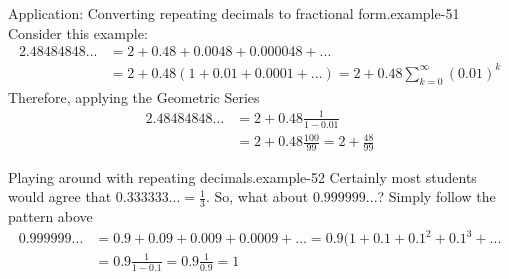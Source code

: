 \documentclass[10pt,]{book}
\numberwithin{equation}{section}
\begin{document}
\begin{example}{Application: Converting repeating decimals to fractional form.}{example-51}%
\hypertarget{p-1216}{}%
Consider this example:%
%
\begin{align*}
2.48484848... & = 2 + 0.48 + 0.0048 + 0.000048 + ...\\
&  = 2 + 0.48(1 + 0.01 + 0.0001 + ... ) = 2 + 0.48 \sum_{k=0}^\infty (0.01)^k
\end{align*}
\hypertarget{p-1217}{}%
Therefore, applying the Geometric Series%
%
\begin{align*}
2.48484848... & = 2 + 0.48 \frac{1}{1-0.01} \\
& = 2 + 0.48 \frac{100}{99} = 2 + \frac{48}{99} 
\end{align*}
\end{example}
\begin{example}{Playing around with repeating decimals.}{example-52}%
\hypertarget{p-1218}{}%
Certainly most students would agree that \(0.333333... = \frac{1}{3} \). So, what about \(0.999999...\)? Simply follow the pattern above%
%
\begin{align*}
0.999999... & = 0.9 + 0.09 + 0.009 + 0.0009 + ... = 0.9(1 + 0.1 + 0.1^2 + 0.1^3 + ...\\
& = 0.9 \frac{1}{1-0.1} = 0.9 \frac{1}{0.9} = 1 
\end{align*}
\end{example}
%
%
\typeout{************************************************}
\typeout{************************************************}
%
\end{document}
